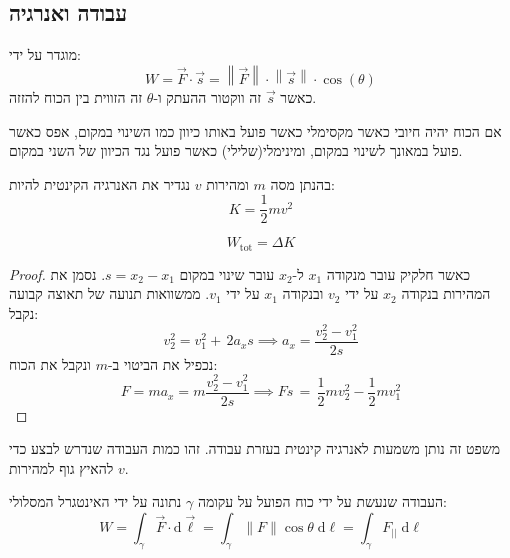 \documentclass{tstextbook}
\begin{document}
\subsection{עבודה ואנרגיה}

\begin{definition}
מוגדר על ידי:
$$W=\vec{F}\cdot \vec{s}=\left\lVert  \vec{F}  \right\rVert \cdot \left\lVert  \vec{s}  \right\rVert \cdot \cos\left( \theta \right)$$
כאשר \(\vec{s}\) זה ווקטור ההעתק ו-\(\theta\) זה הזווית בין הכוח להזזה.

\end{definition}
\begin{corollary}
אם הכוח יהיה חיובי כאשר מקסימלי כאשר פועל באותו כיוון כמו השינוי במקום, אפס כאשר פועל במאונך לשינוי במקום, ומינימלי(שלילי) כאשר פועל נגד הכיוון של השני במקום.

\end{corollary}
\begin{definition}
בהנתן מסה \(m\) ומהירות \(v\) נגדיר את האנרגיה הקינטית להיות:
$$K=\frac{1}{2}mv^{2}$$

\end{definition}
\begin{proposition}
$$W_{\text{tot}}=\Delta K$$

\end{proposition}
\begin{proof}
כאשר חלקיק עובר מנקודה \(x_{1}\) ל-\(x_{2}\) עובר שינוי במקום \(s=x_{2}-x_{1}\). נסמן את המהירות בנקודה \(x_{2}\) על ידי \(v_{2}\) ובנקודה \(x_{1}\) על ידי \(v_{1}\). ממשוואות תנועה של תאוצה קבועה נקבל:
$$v_{2}^{2\!}=v_{1}^{2}+\,2a_{x}s\implies a_{x}={\frac{v_{2}^{2}-{v_{1}^{2}}}{2s}}$$
נכפיל את הביטוי ב-\(m\) ונקבל את הכוח:
$$F=m a_{x}=m{\frac{v_{2}^{2}-v_{1}^{2}}{2s}}\implies F s\,=\,{{\frac{1}{2}}}m v_{2}^{2}-{\frac{1}{2}}m v_{1}^{2}$$

\end{proof}
\begin{remark}
משפט זה נותן משמעות לאנרגיה קינטית בעזרת עבודה. זהו כמות העבודה שנדרש לבצע כדי להאיץ גוף למהירות \(v\).

\end{remark}
\begin{proposition}
העבודה שנעשת על ידי כוח הפועל על עקומה \(\gamma\) נתונה על ידי האינטגרל המסלולי:
$$W=\int_{\gamma} \vec{F} \cdot \mathrm{d}\vec{\ell}=\int _{\gamma}\lVert F \rVert \cos \theta \;\mathrm{d} \ell=\int _{\gamma}F_{||} \;\mathrm{d} \ell   $$

\end{proposition}
\end{document}

